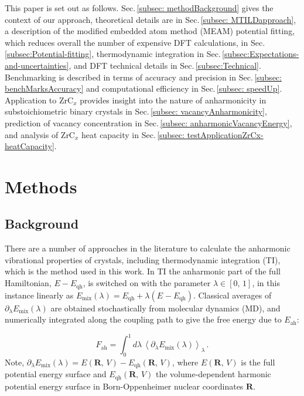 \documentclass[twocolumn,american,aps,prb,showpacs,showkeys,amsmath,amssymb,superscriptaddress,a4]{revtex4-1}
\begin{document}
This paper is set out as follows. Sec.\,\ref{subsec: methodBackground} gives the context of
our approach, theoretical
details are in Sec.\,\ref{subsec: MTILDapproach}, a description of the modified embedded atom method (MEAM) potential fitting, which reduces overall the number of expensive DFT calculations, 
in Sec.\,\ref{subsec:Potential-fitting}, thermodynamic integration
in Sec.\,\ref{subsec:Expectations-and-uncertainties}, and DFT technical
details in Sec.\,\ref{subsec:Technical}. Benchmarking is described
in terms of accuracy and precision in Sec.\,\ref{subsec: benchMarksAccuracy}
and computational efficiency in Sec.\,\ref{subsec: speedUp}. Application
to ZrC$_x$ provides insight into the nature of anharmonicity
in substoichiometric binary crystals in Sec.\,\ref{subsec: vacancyAnharmonicity},
prediction of vacancy concentration in Sec.\,\ref{subsec: anharmonicVacancyEnergy},
and analysis of ZrC$_x$ heat capacity in Sec.\,\ref{subsec: testApplicationZrCx-heatCapacity}.

\section{Methods\label{sec:Method}}

\subsection{Background\label{subsec: methodBackground}}

There are a number of approaches in the literature to calculate the  anharmonic vibrational properties of crystals,\cite{Alfe2001,Alfe2002a,Alfe2002b,Ackland2002,Duff2015,Errea2011,Glensk2014,Grabowski2009,Grabowski2015,Hellman2013,Monserrat2013a,Klein1972a,Fn1964,Frenkel1984,Moustafa2017}
including thermodynamic integration\cite{Kirkwood1935} (TI), which is the method used in this work.  In TI 
the anharmonic part of the full Hamiltonian, $E-E_{\text{qh}}$, is switched on with the parameter
$\lambda\in[0,\,1]$, in this instance linearly as $E_{\text{mix}}(\lambda)=E_{\text{qh}}+\lambda(E^{\text{}}-E_{\text{qh}}^{\text{}})$.
Classical averages of $\partial_{\lambda}E_{\text{mix}}(\lambda)$
are obtained stochastically from molecular dynamics (MD), and numerically integrated along
the coupling path to give the free energy due to $E_{\text{ah}}$:

\begin{equation}
F_{\text{ah}}=\int_{0}^{1}d\lambda\,\left\langle \partial_{\lambda}E_{\text{mix}}(\lambda)\right\rangle _{\lambda}\,.\label{eq: basicAnharmonicFreeEnergy}
\end{equation}
Note, $\partial_{\lambda}E_{\text{mix}}(\lambda)=E(\mathbf{R},\,V)-E_{\text{qh}}(\mathbf{R},\,V)$,
where $E(\mathbf{R},\,V)$ is the full potential energy surface
and $E_{\text{qh}}(\mathbf{R},\,V)$ the volume-dependent harmonic potential energy surface in Born-Oppenheimer nuclear coordinates $\mathbf{R}$.
\end{document}
